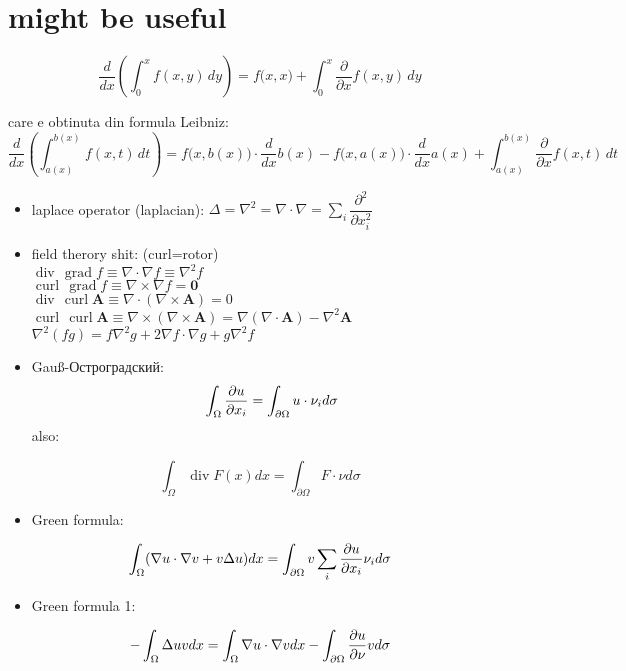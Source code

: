 \documentclass[11pt]{article}
\date{\today}
\title{}
\begin{document}
\section*{might be useful}
\label{sec:org8e94b38}
\[ \frac{d}{dx} \left (\int_{0}^{x} f(x,y)\,dy \right) = f\big(x,x) + \int_{0}^{x}\frac{\partial}{\partial x} f(x,y) \,dy\]

\medskip

care e obtinuta din formula Leibniz:
\[ \frac{d}{dx} \left (\int_{a(x)}^{b(x)}f(x,t)\,dt \right) = f\big(x,b(x)\big)\cdot \frac{d}{dx} b(x) - f\big(x,a(x)\big)\cdot \frac{d}{dx} a(x) + \int_{a(x)}^{b(x)}\frac{\partial}{\partial x} f(x,t) \,dt\]
\begin{itemize}
\item laplace operator (laplacian): \(\Delta = \nabla^2 = \nabla \cdot \nabla = \displaystyle \sum_i \dfrac{\partial^2}{\partial x_i^2}\)
\item field therory shit: (curl=rotor)\\
\(\operatorname{div}  \, \operatorname{grad} f          \equiv \nabla \cdot  \nabla f \equiv \nabla^2 f\)\\
\(\operatorname{curl} \, \operatorname{grad} f          \equiv \nabla \times \nabla f = \mathbf 0\)\\
\(\operatorname{div}  \, \operatorname{curl} \mathbf{A} \equiv \nabla \cdot  (\nabla \times \mathbf{A}) = 0\)\\
\(\operatorname{curl} \, \operatorname{curl} \mathbf{A} \equiv \nabla \times (\nabla \times \mathbf{A}) = \nabla (\nabla \cdot \mathbf{A}) - \nabla^2 \mathbf{A}\)\\
\(\nabla^2 (f g) = f \nabla^2 g + 2 \nabla f \cdot \nabla g + g \nabla^2 f\)
\item Gauß-Остроградский:
\[ \int_\Omega \frac{\partial u}{\partial x_i} = \int_{\partial \Omega}u \cdot \nu_i d \sigma \]
also:
\end{itemize}
\[ \int_\Omega \operatorname{div} F (x) dx = \int_{\partial \Omega} F  \cdot \nu d \sigma \]
\begin{itemize}
\item Green formula:
\end{itemize}
\[\int_\Omega (\nabla u \cdot \nabla v  + v \Delta u) dx = \int_{\partial \Omega} v \sum_i \frac{\partial u}{\partial x_i} \nu_i d \sigma \]
\begin{itemize}
\item Green formula 1:
\end{itemize}
\[ -\int_\Omega \Delta u v dx = \int_\Omega \nabla u \cdot \nabla v dx - \int_{\partial \Omega} \frac{\partial u}{\partial \nu} v  d \sigma \]
\end{document}
